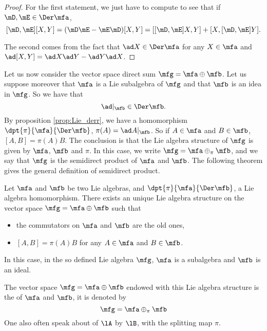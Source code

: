 \begin{proof}
    For the first statement, we just have to compute to see that if $\mD,\mE\in\Der\mfa$,
    \[
        [\mD,\mE][X,Y]=(\mD\mE-\mE\mD)[X,Y]=[ [\mD,\mE]X,Y ]+[ X,[\mD,\mE]Y ].
    \]

    The second comes from the fact that $\ad X\in\Der\mfa$ for any $X\in\mfa$ and
    $\ad[X,Y]=\ad X\ad Y-\ad Y\ad X$.
\end{proof}

Let us now consider the vector space direct sum $\mfg=\mfa\oplus\mfb$. Let us suppose moreover that $\mfa$ is a Lie subalgebra of $\mfg$ and that $\mfb$ is an idea in $\mfg$. So we have that
\[
   \ad|_{\mfb}\in\Der\mfb.
\]
By proposition \ref{prop:Lie_derr}, we have a homomorphism $\dpt{\pi}{\mfa}{\Der\mfb}$, $\pi(A)=\ad A|_{\mfb}$. So if $A\in\mfa$ and $B\in\mfb$, $[A,B]=\pi(A)B$. The conclusion is that the Lie algebra structure of $\mfg$ is given by $\mfa$, $\mfb$ and $\pi$. In this case, we write   $\mfg=\mfa\oplus_{\pi}\mfb$,
and we say that $\mfg$ is the semidirect product of $\mfa$ and $\mfb$. The following theorem gives the general definition of semidirect product.

\begin{theorem}
    Let $\mfa$ and $\mfb$ be two Lie algebras, and $\dpt{\pi}{\mfa}{\Der\mfb}$, a Lie algebra homomorphism. There exists an unique Lie algebra structure on the vector space $\mfg=\mfa\oplus\mfb$ such that
    \begin{itemize}  
    \item the commutators on $\mfa$ and $\mfb$ are the old ones,
    \item $[A,B]=\pi(A)B$ for any $A\in\mfa$ and $B\in\mfb$.
    \end{itemize}
    In this case, in the so defined Lie algebra $\mfg$, $\mfa$ is a subalgebra and $\mfb$ is an ideal.
\end{theorem}

The vector space $\mfg=\mfa\oplus\mfb$ endowed with this Lie algebra structure is the 
 of $\mfa$ and $\mfb$, it is denoted by 
\[
  \mfg=\mfa\oplus_{\pi}\mfb
\]
One also often speak about  of $\lA$ by $\lB$, with the splitting map $\pi$.

